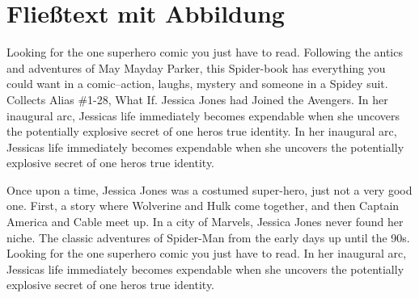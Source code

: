 \section{Fließtext mit Abbildung}
Looking for the one superhero comic you just have to read. Following the antics and adventures of May Mayday Parker, this Spider-book has everything you could want in a comic--action, laughs, mystery and someone in a Spidey suit. Collects Alias \#1-28, What If. Jessica Jones had Joined the Avengers. In her inaugural arc, Jessicas life immediately becomes expendable when she uncovers the potentially explosive secret of one heros true identity. In her inaugural arc, Jessicas life immediately becomes expendable when she uncovers the potentially explosive secret of one heros true identity.

Once upon a time, Jessica Jones was a costumed super-hero, just not a very good one. First, a story where Wolverine and Hulk come together, and then Captain America and Cable meet up. In a city of Marvels, Jessica Jones never found her niche. The classic adventures of Spider-Man from the early days up until the 90s. Looking for the one superhero comic you just have to read. In her inaugural arc, Jessicas life immediately becomes expendable when she uncovers the potentially explosive secret of one heros true identity.

